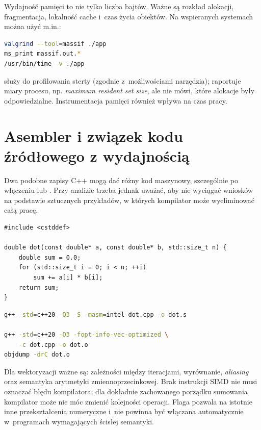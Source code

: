 Wydajność pamięci to nie tylko liczba bajtów. Ważne są rozkład
alokacji, fragmentacja, lokalność cache i~czas życia obiektów.
Na wspieranych systemach można użyć m.in.:

\begin{lstlisting}[language=bash,caption={Przykladowe pomiary alokacji i pamieci.}]
valgrind --tool=massif ./app
ms_print massif.out.*
/usr/bin/time -v ./app
\end{lstlisting}

 służy do profilowania sterty (zgodnie z~możliwościami
narzędzia);  raportuje miary procesu, np.
\emph{maximum resident set size}, ale nie mówi, które alokacje były
odpowiedzialne. Instrumentacja pamięci również wpływa na czas pracy.

\section{Asembler i związek kodu źródłowego z wydajnością}
\label{sec:cpp18-asm}

Dwa podobne zapisy C++ mogą dać różny kod maszynowy, szczególnie po
włączeniu  lub . Przy analizie trzeba jednak
uważać, aby nie wyciągać wniosków na podstawie sztucznych przykładów,
w których kompilator może wyeliminować całą pracę.

\begin{lstlisting}[caption={Niewielka funkcja do analizy wygenerowanego kodu.}]
#include <cstddef>

double dot(const double* a, const double* b, std::size_t n) {
    double sum = 0.0;
    for (std::size_t i = 0; i < n; ++i)
        sum += a[i] * b[i];
    return sum;
}
\end{lstlisting}

\begin{lstlisting}[language=bash,caption={Asembler i raport wektoryzacji w GCC (Linux).}]
g++ -std=c++20 -O3 -S -masm=intel dot.cpp -o dot.s

g++ -std=c++20 -O3 -fopt-info-vec-optimized \
    -c dot.cpp -o dot.o
objdump -drC dot.o
\end{lstlisting}

Dla wektoryzacji ważne są: zależności między iteracjami, wyrównanie,
\emph{aliasing} oraz semantyka arytmetyki zmiennoprzecinkowej.
Brak instrukcji SIMD nie musi oznaczać błędu kompilatora; dla
dokładnie zachowanego porządku sumowania kompilator może nie móc
zmienić kolejności operacji. Flaga \code{-ffast-math} pozwala na
istotnie inne przekształcenia numeryczne i~nie powinna być
włączana automatycznie w~programach wymagających ścisłej semantyki.

